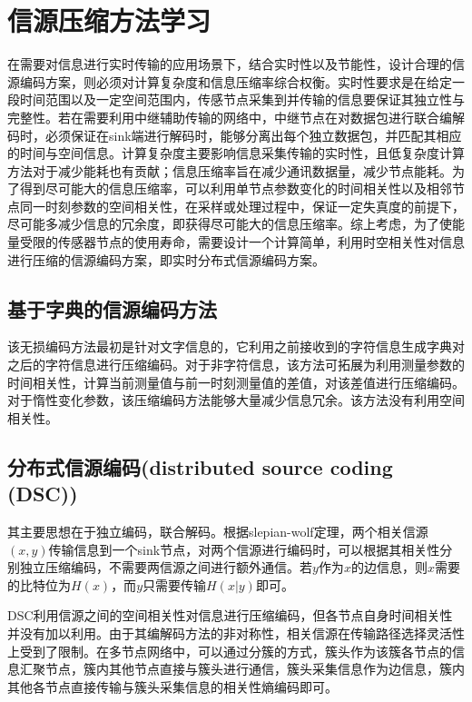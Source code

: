 \chapter{信源压缩方法学习}



在需要对信息进行实时传输的应用场景下，结合实时性以及节能性，设计合理的信源编码方案，则必须对计算复杂度和信息压缩率综合权衡。实时性要求是在给定一段时间范围以及一定空间范围内，传感节点采集到并传输的信息要保证其独立性与完整性。若在需要利用中继辅助传输的网络中，中继节点在对数据包进行联合编解码时，必须保证在sink端进行解码时，能够分离出每个独立数据包，并匹配其相应的时间与空间信息。计算复杂度主要影响信息采集传输的实时性，且低复杂度计算方法对于减少能耗也有贡献；信息压缩率旨在减少通讯数据量，减少节点能耗。为了得到尽可能大的信息压缩率，可以利用单节点参数变化的时间相关性以及相邻节点同一时刻参数的空间相关性，在采样或处理过程中，保证一定失真度的前提下，尽可能多减少信息的冗余度，即获得尽可能大的信息压缩率。综上考虑，为了使能量受限的传感器节点的使用寿命，需要设计一个计算简单，利用时空相关性对信息进行压缩的信源编码方案，即实时分布式信源编码方案。



\section{基于字典的信源编码方法}
该无损编码方法最初是针对文字信息的，它利用之前接收到的字符信息生成字典对之后的字符信息进行压缩编码。对于非字符信息，该方法可拓展为利用测量参数的时间相关性，计算当前测量值与前一时刻测量值的差值，对该差值进行压缩编码。\textcolor[rgb]{1,0,0}{对于惰性变化参数，该压缩编码方法能够大量减少信息冗余}。\textcolor[rgb]{0,0,1}{该方法没有利用空间相关性}。



\section{分布式信源编码(distributed source coding (DSC))}
其主要思想在于独立编码，联合解码。根据slepian-wolf定理，两个相关信源$(x,y)$传输信息到一个sink节点，对两个信源进行编码时，可以根据其相关性分别独立压缩编码，不需要两信源之间进行额外通信。若$y$作为$x$的边信息，则$x$需要的比特位为$H(x)$，而$y$只需要传输$H(x|y)$即可。

DSC利用信源之间的空间相关性对信息进行压缩编码，但各节点自身时间相关性并没有加以利用。由于其编解码方法的非对称性，相关信源在传输路径选择灵活性上受到了限制。在多节点网络中，可以通过分簇的方式，簇头作为该簇各节点的信息汇聚节点，簇内其他节点直接与簇头进行通信，簇头采集信息作为边信息，簇内其他各节点直接传输与簇头采集信息的相关性熵编码即可。

